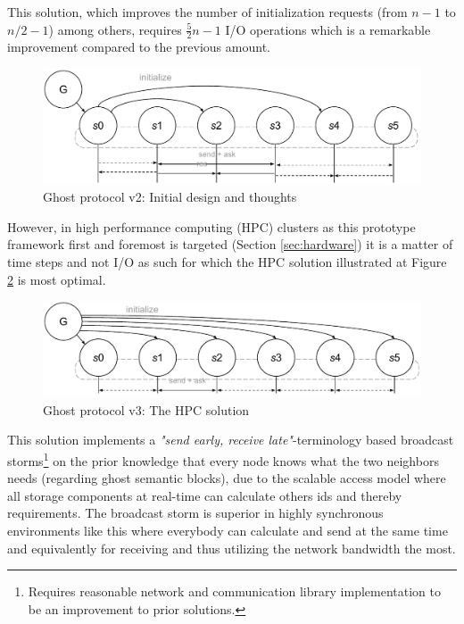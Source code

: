 This solution, which improves the number of initialization requests (from $n-1$ to $n/2-1$) among others, requires $\frac{5}{2}n-1$ I/O operations which is a remarkable improvement compared to the previous amount.

\begin{figure}[ht!]
	\centering
	\vspace*{3mm}
	\includegraphics[scale=0.68]{pdf/ghost-v1.pdf}
	\caption{Ghost protocol v2: Initial design and thoughts \label{fig:ghost-v1}}
	\vspace*{3mm}
\end{figure}	

However, in high performance computing (HPC) clusters as this prototype framework first and foremost is targeted (Section \ref{sec:hardware}) it is a matter of time steps and not I/O as such for which the HPC solution illustrated at Figure \ref{fig:ghost-final} is most optimal.
\newline

\begin{figure}
	\centering
	\includegraphics[scale=0.68]{pdf/ghost-final.pdf}
	\caption{Ghost protocol v3: The HPC solution \label{fig:ghost-final}}
\end{figure}	

This solution implements a \textit{"send early, receive late"}-terminology based broadcast storms\footnote{Requires reasonable network and communication library implementation to be an improvement to prior solutions.} on the prior knowledge that every node knows what the two neighbors needs (regarding ghost semantic blocks), due to the scalable access model where all storage components at real-time can calculate others ids and thereby requirements. The broadcast storm is superior in highly synchronous environments like this where everybody can calculate and send at the same time and equivalently for receiving and thus utilizing the network bandwidth the most. 

